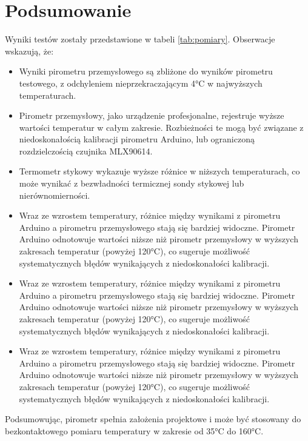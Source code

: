 \chapter{Podsumowanie}

Wyniki testów zostały przedstawione w tabeli \ref{tab:pomiary}. Obserwacje wskazują, że:
\begin{itemize}
\item Wyniki pirometru przemysłowego są zbliżone do wyników pirometru testowego, z odchyleniem nieprzekraczającym 4°C w najwyższych temperaturach.
\item Pirometr przemysłowy, jako urządzenie profesjonalne, rejestruje wyższe wartości
temperatur w całym zakresie. Rozbieżności te mogą być związane z niedoskonałością
kalibracji pirometru Arduino, lub ograniczoną rozdzielczością czujnika MLX90614.
\item Termometr stykowy wykazuje wyższe różnice w niższych temperaturach, co
może wynikać z bezwładności termicznej sondy stykowej lub nierównomierności.\item Wraz ze wzrostem temperatury, różnice między wynikami z pirometru Arduino
a pirometru przemysłowego stają się bardziej widoczne. Pirometr Arduino
odnotowuje wartości niższe niż pirometr przemysłowy w wyższych zakresach
temperatur (powyżej 120°C), co sugeruje możliwość systematycznych błędów
wynikających z niedoskonałości kalibracji. \item Wraz ze wzrostem temperatury, różnice między wynikami z pirometru Arduino a pirometru przemysłowego stają się bardziej widoczne. Pirometr Arduino
odnotowuje wartości niższe niż pirometr przemysłowy w wyższych zakresach
temperatur (powyżej 120°C), co sugeruje możliwość systematycznych błędów
wynikających z niedoskonałości kalibracji.
\item Wraz ze wzrostem temperatury, różnice między wynikami z pirometru Arduino
a pirometru przemysłowego stają się bardziej widoczne. Pirometr Arduino
odnotowuje wartości niższe niż pirometr przemysłowy w wyższych zakresach
temperatur (powyżej 120°C), co sugeruje możliwość systematycznych błędów
wynikających z niedoskonałości kalibracji.
\end{itemize}

Podsumowując, pirometr spełnia założenia projektowe i może być stosowany do bezkontaktowego pomiaru temperatury w zakresie od 35°C do 160°C.

